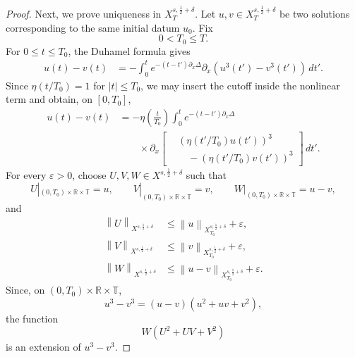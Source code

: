 \documentclass[12pt,oneside,reqno]{amsart}
\numberwithin{equation}{section}
\theoremstyle{plain}
\def\R{{\mathbb R}}
\def\T{{\mathbb T}}
\newcommand{\norm}[1]{%
    \left\lVert #1\right\rVert%
}
\newcommand{\prc}[1]{%
    \left(#1\right)
}
\def\pt{\partial}
\newcommand{\xnorm}[3]{%
    \left\lVert #1\right\rVert_{X^{{#2},{#3}}}%
}
\newcommand{\rt}{\R\times\T}
\begin{document}
\begin{proof}
Next, we prove uniqueness in
$X_T^{s,\frac12+\delta}$. Let
$u,v\in X_T^{s,\frac12+\delta}$ be two solutions corresponding to the
same initial datum $u_0$. Fix
\begin{equation}
    0<T_0\leq T.
\end{equation}
For $0\leq t\leq T_0$, the Duhamel formula gives
\begin{equation}
\begin{aligned}
u(t)-v(t)
&=
-
\int_0^t
e^{-(t-t')\pt_x\Delta}
\pt_x
\prc{
    u^3(t')-v^3(t')
}
\,dt'.
\end{aligned}
\end{equation}
Since $\eta(t/T_0)=1$ for $|t|\leq T_0$, we may insert the cutoff
inside the nonlinear term and obtain, on $[0,T_0]$,
\begin{equation}
\begin{aligned}
u(t)-v(t)
&=
-
\eta\prc{\frac{t}{T_0}}
\int_0^t
e^{-(t-t')\pt_x\Delta}
\\
&\qquad {}\mathbin{\times}\pt_x
\left[
\begin{aligned}
    &\prc{\eta(t'/T_0)u(t')}^3\\
    &\quad-
    \prc{\eta(t'/T_0)v(t')}^3
\end{aligned}
\right]
\,dt'.
\end{aligned}
\end{equation}
For every $\varepsilon>0$, choose
$U,V,W\in X^{s,\frac12+\delta}$ such that
\begin{equation}
    U|_{(0,T_0)\times\rt}=u,
    \qquad
    V|_{(0,T_0)\times\rt}=v,
    \qquad
    W|_{(0,T_0)\times\rt}=u-v,
\end{equation}
and
\begin{equation}
\begin{aligned}
    \xnorm{U}{s}{\frac12+\delta}
    &\leq
    \norm{u}_{X_{T_0}^{s,\frac12+\delta}}
    +\varepsilon,
    \\
    \xnorm{V}{s}{\frac12+\delta}
    &\leq
    \norm{v}_{X_{T_0}^{s,\frac12+\delta}}
    +\varepsilon,
    \\
    \xnorm{W}{s}{\frac12+\delta}
    &\leq
    \norm{u-v}_{X_{T_0}^{s,\frac12+\delta}}
    +\varepsilon.
\end{aligned}
\end{equation}
Since, on $(0,T_0)\times\rt$,
\begin{equation}
    u^3-v^3
    =
    (u-v)(u^2+uv+v^2),
\end{equation}
the function
\begin{equation}
    W(U^2+UV+V^2)
\end{equation}
is an extension of $u^3-v^3$.


\end{proof}
\end{document}
